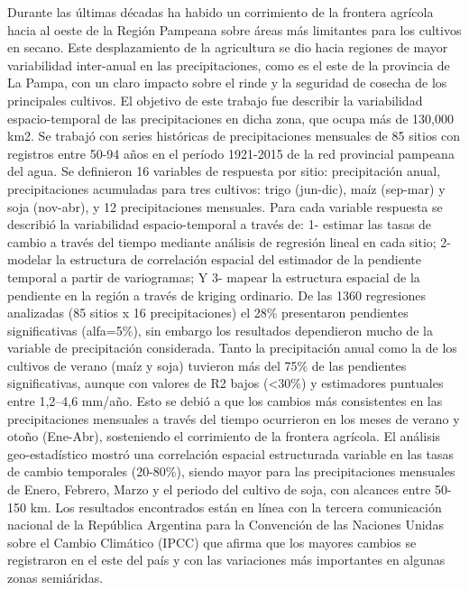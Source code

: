 {Durante las últimas décadas ha habido un corrimiento de la frontera agrícola hacia al oeste de la Región Pampeana sobre áreas más limitantes para los cultivos en secano. Este desplazamiento de la agricultura se dio hacia regiones de mayor variabilidad inter-anual en las precipitaciones, como es el este de la provincia de La Pampa, con un claro impacto sobre el rinde y la seguridad de cosecha de los principales cultivos. El objetivo de este trabajo fue describir la variabilidad espacio-temporal de las precipitaciones en dicha zona, que ocupa más de 130,000 km2. Se trabajó con series históricas de precipitaciones mensuales de 85 sitios con registros entre 50-94 años en el período 1921-2015 de la red provincial pampeana del agua. Se definieron 16 variables de respuesta por sitio: precipitación anual, precipitaciones acumuladas para tres cultivos: trigo (jun-dic), maíz (sep-mar) y soja (nov-abr), y 12 precipitaciones mensuales. Para cada variable respuesta se describió la variabilidad espacio-temporal a través de: 1- estimar las tasas de cambio a través del tiempo mediante análisis de regresión lineal en cada sitio; 2- modelar la estructura de correlación espacial del estimador de la pendiente temporal a partir de variogramas; Y 3- mapear la estructura espacial de la pendiente en la región a través de kriging ordinario. De las 1360 regresiones analizadas (85 sitios x 16 precipitaciones) el 28\% presentaron pendientes significativas (alfa=5\%), sin embargo los resultados dependieron mucho de la variable de precipitación considerada. Tanto la precipitación anual como la de los cultivos de verano (maíz y soja) tuvieron más del 75\% de las pendientes significativas, aunque con valores de R2 bajos (<30\%) y estimadores puntuales entre 1,2–4,6 mm/año. Esto se debió a que los cambios más consistentes en las precipitaciones mensuales a través del tiempo ocurrieron en los meses de verano y otoño (Ene-Abr), sosteniendo el corrimiento de la frontera agrícola. El análisis geo-estadístico mostró una correlación espacial estructurada variable en las tasas de cambio temporales (20-80\%), siendo mayor para las precipitaciones mensuales de Enero, Febrero, Marzo y el periodo del cultivo de soja, con alcances entre 50-150 km. Los resultados encontrados están en línea con la tercera comunicación nacional de la República Argentina para la Convención de las Naciones Unidas sobre el Cambio Climático (IPCC) que afirma que los mayores cambios se registraron en el este del país y con las variaciones más importantes en algunas zonas semiáridas. }
